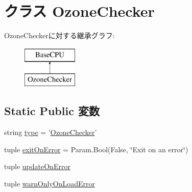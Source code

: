 \hypertarget{classOzoneChecker_1_1OzoneChecker}{
\section{クラス OzoneChecker}
\label{classOzoneChecker_1_1OzoneChecker}
}
OzoneCheckerに対する継承グラフ:\begin{figure}[H]
\begin{center}
\leavevmode
\includegraphics[height=2cm]{classOzoneChecker_1_1OzoneChecker}
\end{center}
\end{figure}
\subsection*{Static Public 変数}
\begin{DoxyCompactItemize}
\item 
string \hyperlink{classOzoneChecker_1_1OzoneChecker_acce15679d830831b0bbe8ebc2a60b2ca}{type} = '\hyperlink{classOzoneChecker_1_1OzoneChecker}{OzoneChecker}'
\item 
tuple \hyperlink{classOzoneChecker_1_1OzoneChecker_ae3f9ab8da88c7ebfba47692201291bed}{exitOnError} = Param.Bool(False, \char`\"{}Exit on an error\char`\"{})
\item 
tuple \hyperlink{classOzoneChecker_1_1OzoneChecker_aad41d3eb2d73f3e7035d73c73bf92523}{updateOnError}
\item 
tuple \hyperlink{classOzoneChecker_1_1OzoneChecker_a2c725933b14b9d3c867f1ab31a36274e}{warnOnlyOnLoadError}
\end{DoxyCompactItemize}


